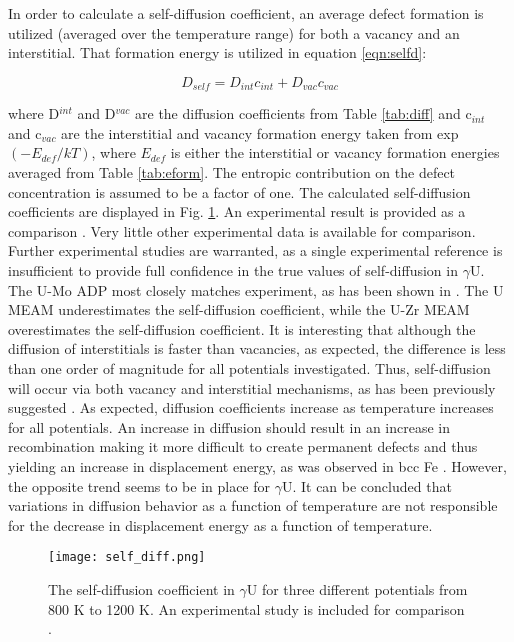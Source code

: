 \documentclass[review]{elsarticle}
\begin{document}
In order to calculate a self-diffusion coefficient, an average defect formation is utilized (averaged over the temperature range) for both a vacancy and an interstitial. That formation energy is utilized in equation \ref{eqn:selfd}:

\begin{equation}
\label{eqn:selfd}
D_{self} = D_{int}c_{int} + D_{vac}c_{vac}
\end{equation} 

where D$^{int}$ and D$^{vac}$ are the diffusion coefficients from Table \ref{tab:diff} and c$_{int}$ and c$_{vac}$ are the interstitial and vacancy formation energy taken from exp$(-E_{def}/kT)$, where $E_{def}$ is either the interstitial or vacancy formation energies averaged from Table \ref{tab:eform}. The entropic contribution on the defect concentration is assumed to be a factor of one. The calculated self-diffusion coefficients are displayed in Fig. \ref{fig:gamUdiff}. An experimental result is provided as a comparison \cite{adda1959}. Very little other experimental data is available for comparison. Further experimental studies are warranted, as a single experimental reference is insufficient to provide full confidence in the true values of self-diffusion in $\gamma$U. The U-Mo ADP most closely matches experiment, as has been shown in \cite{smirnovaADP}. The U MEAM underestimates the self-diffusion coefficient, while the U-Zr MEAM overestimates the self-diffusion coefficient. It is interesting that although the diffusion of interstitials is faster than vacancies, as expected, the difference is less than one order of magnitude for all potentials investigated. Thus, self-diffusion will occur via both vacancy and interstitial mechanisms, as has been previously suggested \cite{fedorov1978, smirnov1992}. As expected, diffusion coefficients increase as temperature increases for all potentials. An increase in diffusion should result in an increase in recombination making it more difficult to create permanent defects and thus yielding an increase in displacement energy, as was observed in bcc Fe \cite{beeler2016}. However, the opposite trend seems to be in place for $\gamma$U. It can be concluded that variations in diffusion behavior as a function of temperature are not responsible for the decrease in displacement energy as a function of temperature.

\begin{figure}[h]
 \centering
 \texttt{[image: self\_diff.png]} 
 \caption{The self-diffusion coefficient in $\gamma$U for three different potentials from 800 K to 1200 K. An experimental study is included for comparison \cite{adda1959}.}
 \label{fig:gamUdiff}
\end{figure}
\end{document}
